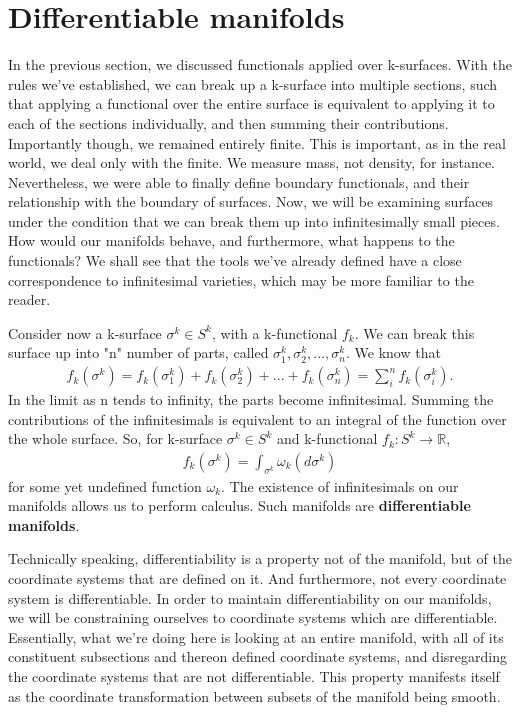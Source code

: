 \documentclass{book}
\begin{document}
\section{Differentiable manifolds}



In the previous section, we discussed functionals applied over k-surfaces. With the rules we've established, we can break up a k-surface into multiple sections, such that applying a functional over the entire surface is equivalent to applying it to each of the sections individually, and then summing their contributions. Importantly though, we remained entirely finite. This is important, as in the real world, we deal only with the finite. We measure mass, not density, for instance. Nevertheless, we were able to finally define boundary functionals, and their relationship with the boundary of surfaces. Now, we will be examining surfaces under the condition that we can break them up into infinitesimally small pieces. How would our manifolds behave, and furthermore, what happens to the functionals? We shall see that the tools we've already defined have a close correspondence to infinitesimal varieties, which may be more familiar to the reader. 

Consider now a k-surface $\sigma^k \in S^k$, with a k-functional $f_k$. We can break this surface up into "n" number of parts, called $\sigma^k_1, \sigma^k_2, ..., \sigma^k_n$. We know that \begin{gather} f_k(\sigma^k) = f_k(\sigma^k_1) + f_k(\sigma^k_2) + ... + f_k(\sigma^k_n) = \sum^n_if_k(\sigma^k_i).\end{gather} In the limit as n tends to infinity, the parts become infinitesimal. Summing the contributions of the infinitesimals is equivalent to an integral of the function over the whole surface. So, for k-surface $\sigma^k \in S^k$ and k-functional $f_k: S^k \to \mathbb{R}$, \begin{gather} f_k(\sigma^k) = \int_{\sigma^k}\omega_k(d\sigma^k) \end{gather} for some yet undefined function $\omega_k$. The existence of infinitesimals on our manifolds allows us to perform calculus. Such manifolds are \textbf{differentiable manifolds}. 

Technically speaking, differentiability is a property not of the manifold, but of the coordinate systems that are defined on it. And furthermore, not every coordinate system is differentiable. In order to maintain differentiability on our manifolds, we will be constraining ourselves to coordinate systems which are differentiable. Essentially, what we're doing here is looking at an entire manifold, with all of its constituent subsections and thereon defined coordinate systems, and disregarding the coordinate systems that are not differentiable. This property manifests itself as the coordinate transformation between subsets of the manifold being smooth. 
\end{document}
